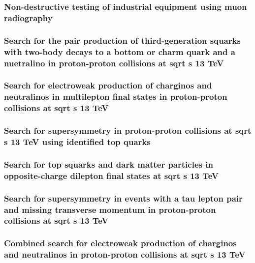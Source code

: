 \documentclass[a4paper, 11pt, twoside, openright]{report}
\begin{document}
\subsubsection{Non-destructive testing of industrial equipment using muon radiography}
%
\subsubsection{Search for the pair production of third-generation squarks with two-body decays to a bottom or charm quark and a nuetralino in proton-proton collisions at sqrt s 13 TeV}
%
\subsubsection{Search for electroweak production of charginos and neutralinos in multilepton final states in proton-proton collisions at sqrt s 13 TeV}
%
\subsubsection{Search for supersymmetry in proton-proton collisions at sqrt s 13 TeV using identified top quarks}
%
\subsubsection{Search for top squarks and dark matter particles in opposite-charge dilepton final states at sqrt s 13 TeV}
%
\subsubsection{Search for supersymmetry in events with a tau lepton pair and missing transverse momentum in proton-proton collisions at sqrt s 13 TeV}
%
\subsubsection{Combined search for electroweak production of charginos and neutralinos in proton-proton collisions at sqrt s 13 TeV}
%
\end{document}
